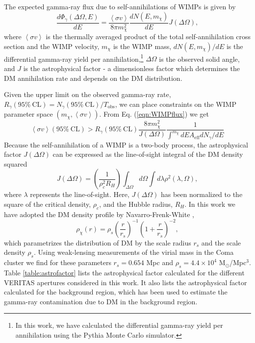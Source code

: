 \documentclass[12pt,manuscript]{aastex}
\newcommand{\expval}[1]{\left\langle #1 \right\rangle}
\begin{document}
The expected gamma-ray flux due to self-annihilations of WIMPs is given by 
\begin{equation}
\frac{d\Phi_{\gamma}(\Delta\Omega,E)}{dE}=
\frac{\expval{\sigma v}}{8\pi m_{\chi}^{2}}\frac{dN(E,m_{\chi})}{dE} J(\Delta\Omega),
\label{eqn:WIMPflux}
\end{equation}
where $\expval{\sigma v}$ is the thermally averaged product of the total self-annihilation cross
section and the WIMP velocity, $m_{\chi}$ is the WIMP mass, $dN(E,m_{\chi})/dE$ is the differential
gamma-ray yield per annihilation,\footnote{In this work, we have calculated the differential
gamma-ray yield per annihilation using the Pythia Monte Carlo simulator.} $\Delta\Omega$ is the
observed solid angle, and $J$ is the astrophysical factor - a dimensionless factor which determines
the DM annihilation rate and depends on the DM distribution.

Given the upper limit on the observed gamma-ray rate,
$R_{\gamma}(95\%\ \mathrm{CL}) = N_{\gamma}(95\%\ \mathrm{CL}) / T_{\mathrm{obs}}$, we can place
constraints on the WIMP parameter space $(m_{\chi}, \expval{\sigma v})$. From Eq.
(\ref{eqn:WIMPflux}) we get
\begin{equation}
\expval{\sigma v}(95\%\ \mathrm{CL}) > 
R_{\gamma}(95\%\ \mathrm{CL}) \frac{8\pi m_{\chi}^{2}}{J(\Delta\Omega)}
\frac{1}{\int^{m_{\chi}} dE A_{\mathrm{eff}}dN_{\gamma}/dE}
\end{equation}
Because the self-annihilation of a WIMP is a two-body process, the astrophysical factor
$J(\Delta\Omega)$ can be expressed as the line-of-sight integral of the DM density squared
\begin{equation}
J(\Delta\Omega)=\left(\frac{1}{\rho_{c}^{2}R_{H}}\right)
\int_{\Delta\Omega}d\Omega\int d\lambda \rho^{2}(\lambda,\Omega),
\end{equation}
where $\lambda$ represents the line-of-sight. Here,
$J(\Delta\Omega)$ has been normalized to the square of the critical density, $\rho_{c}$, and the
Hubble radius, $R_{H}$. In this work we have adopted the DM density profile by
Navarro-Frenk-White \citep[NFW;][]{article:NavarroFrenkWhite:1997},
\begin{equation}
\rho_{\chi}(r)=\rho_{s}\left(\frac{r}{r_{s}}\right)^{-1}\left(1+\frac{r}{r_{s}}\right)^{-2},
\end{equation} 
which parametrizes the distribution of DM by the scale radius $r_{s}$ and the scale density
$\rho_{s}$. Using weak-lensing measurements of the virial mass in the Coma cluster
\citep{article:Gavazzi_etal:2009} we find for these parameters $r_{s}=0.654$ Mpc and
$\rho_{s}=4.4\times 10^{4}$ M$_{\odot}$/Mpc$^{3}$. Table \ref{table:astrofactor} lists the
astrophysical factor calculated for the different VERITAS apertures considered in this work.
It also lists the astrophysical factor calculated for the background region, which has been used
to estimate the gamma-ray contamination due to DM in the background region.
\end{document}
